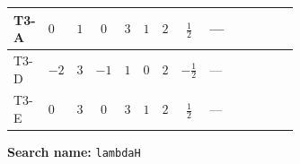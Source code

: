 \documentclass[8pt]{article}
\begin{document}
\begin{landscape}
\begin{longtable}{@{}llcccccc >{\raggedright\arraybackslash}p{0.21\linewidth} >{\raggedright\arraybackslash}p{0.21\linewidth} >{\raggedright\arraybackslash}p{0.21\linewidth}@{}}
\midrule
T3-A & $0$ & $1$ & $0$ & $3$ & $1$ & $2$ & $\frac{1}{2}$ & --- & \scriptsize\adjustbox{max width=\linewidth}{$\begin{gathered} +4 {\lambda_{T3}} \left({\lambda_{T3}}\right)^{*}\end{gathered}$} & \scriptsize\adjustbox{max width=\linewidth}{$\begin{gathered} +\frac{9 {g_2}^4}{4}\end{gathered}$} \\
\midrule
T3-D & $-2$ & $3$ & $-1$ & $1$ & $0$ & $2$ & $-\frac{1}{2}$ & --- & \scriptsize\adjustbox{max width=\linewidth}{$\begin{gathered} +4 {\lambda_{T3}} \left({\lambda_{T3}}\right)^{*}\end{gathered}$} & \scriptsize\adjustbox{max width=\linewidth}{$\begin{gathered} +\frac{9 {g_2}^4}{4}\end{gathered}$} \\
\midrule
T3-E & $0$ & $3$ & $0$ & $3$ & $1$ & $2$ & $\frac{1}{2}$ & --- & \scriptsize\adjustbox{max width=\linewidth}{$\begin{gathered} +4 {\lambda_{T3}} \left({\lambda_{T3}}\right)^{*}\end{gathered}$} & \scriptsize\adjustbox{max width=\linewidth}{$\begin{gathered} +\frac{9 {g_2}^4}{4}\end{gathered}$} \\
\midrule
\bottomrule
\end{longtable}
\clearpage
\noindent\textbf{Search name: }\texttt{lambdaH}\par\smallskip

\end{landscape}
\end{document}
